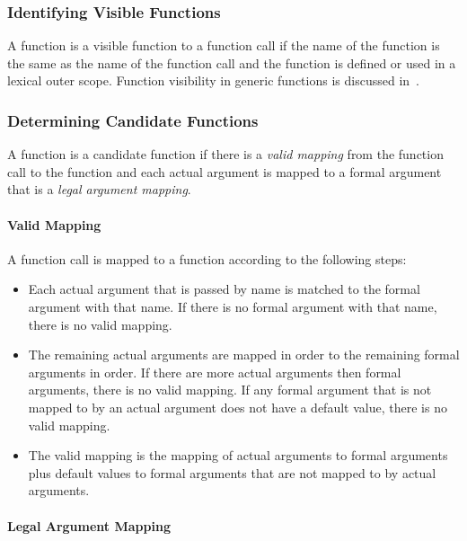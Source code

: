 \subsubsection{Identifying Visible Functions}
\label{Identifying_Visible_Functions}

A function is a visible function to a function call if the name of the
function is the same as the name of the function call and the function
is defined or used in a lexical outer scope.  Function visibility in
generic functions is discussed
in~.

\subsubsection{Determining Candidate Functions}
\label{Determining_Candidate_Functions}

A function is a candidate function if there is a {\em valid mapping}
from the function call to the function and each actual argument is
mapped to a formal argument that is a {\em legal argument mapping}.

\paragraph{Valid Mapping}

A function call is mapped to a function according to the following
steps:
\begin{itemize}
\item
Each actual argument that is passed by name is matched to the formal
argument with that name.  If there is no formal argument with that
name, there is no valid mapping.
\item
The remaining actual arguments are mapped in order to the remaining
formal arguments in order.  If there are more actual arguments then
formal arguments, there is no valid mapping.  If any formal argument
that is not mapped to by an actual argument does not have a default
value, there is no valid mapping.
\item
The valid mapping is the mapping of actual arguments to formal
arguments plus default values to formal arguments that are not mapped
to by actual arguments.
\end{itemize}

\paragraph{Legal Argument Mapping}

